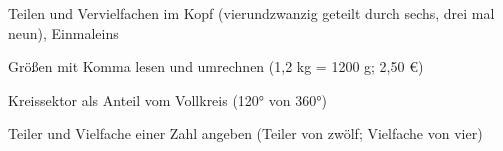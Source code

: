 \setcounter{aufgabe}{0}

\begin{aufgabe}{Teilen und Vervielfachen im Kopf (vierundzwanzig geteilt durch sechs, drei mal neun), Einmaleins}
\end{aufgabe}

\begin{aufgabe}{Größen mit Komma lesen und umrechnen (1,2 kg = 1200 g; 2,50 €)}
\end{aufgabe}

\begin{aufgabe}{Kreissektor als Anteil vom Vollkreis (120° von 360°)}
\end{aufgabe}

\begin{aufgabe}{Teiler und Vielfache einer Zahl angeben (Teiler von zwölf; Vielfache von vier)}
\end{aufgabe}

